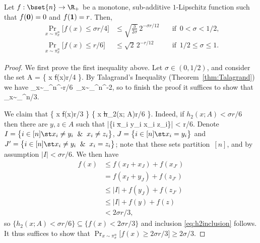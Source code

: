 \begin{lemma} \label{lem:subadditive}
Let $f:\bset{n} \to \R_+$ be a monotone, sub-additive $1$-Lipschitz function such that $f({\bf 0}) =0$ and $f({\bf 1}) = r$.
Then,
\begin{align*}
    \Pr_{x\sim \pi_{\sigma}^n} \big[f(x) \leq \sigma r/4\big] &\leq \sqrt{\frac{3}{2\sigma}}\, 2^{-\sigma r/12} \quad &\text{if $\,0 < \sigma < 1/2$,} \\
    \Pr_{x\sim \pi_{\sigma}^n} \big[f(x) \leq r/6\big] &\leq \sqrt{2}\, 2^{-r/12} &\text{if $\,1/2 \leq \sigma \leq 1$.}
\end{align*}
\end{lemma}

\begin{proof}
We first prove the first inequality above.
Let $\sigma\in (0, 1/2)$, and consider the set
\beqn
A = \big\{ x\in {} \st f(x)\leq \sigma r/4 \big\}.
\eeqn
By Talagrand's Inequality (Theorem~\ref{thm:Talagrand}) we have
\beqn
\Pr_{x\sim \pi_{\sigma}^n} ^{-\sigma r/6} \,\Pr_{x\sim \pi_{\sigma}^n}^{-2},
\eeqn
so to finish the proof it suffices to show that
\beqn
\Pr_{x\sim \pi_{\sigma}^n} \sigma/3.
\eeqn

We claim that
\beq \label{eq:h2inclusion}
\big\{ x\in {} \st f(x)\sigma r/3 \big\} \subseteq \big\{ x\in {} \st h_2(x; A)\geq \sigma r/6 \big\}.
\eeq
Indeed, if $h_2(x; A) < \sigma r/6$ then there are $y, z\in A$ such that
\beqn
\big|\big\{i \in [n] \st x_i \neq y_i \And x_i \neq z_i\big\}\big| < \sigma r/6.
\eeqn
Denote $I = \big\{i \in [n] \st x_i \neq y_i \And x_i \neq z_i\big\}$, $J = \big\{i \in [n] \st x_i = y_i\big\}$ and $J' = \big\{i \in [n] \st x_i \neq y_i \And x_i = z_i\big\}$;
note that these sets partition~$[n]$, and by assumption $|I| < \sigma r/6$.
We then have
\begin{align*}
    f(x) &\leq f(x_I + x_J) + f(x_{J'}) \\
    &= f(x_I + y_J) + f(z_{J'}) \\
    &\leq |I| + f(y_J) + f(z_{J'}) \\
    &\leq |I| + f(y) + f(z) \\
    &< 2\sigma r/3,
\end{align*}
so $\big\{h_2(x; A) < \sigma r/6\big\} \subseteq \big\{f(x) < 2\sigma r/3\big\}$ and inclusion \eqref{eq:h2inclusion} follows.
It thus suffices to show that $\Pr_{x\sim \pi_{\sigma}^n}\big[ f(x)\geq 2\sigma r/3\big] \geq 2\sigma/3$.


\end{proof}
